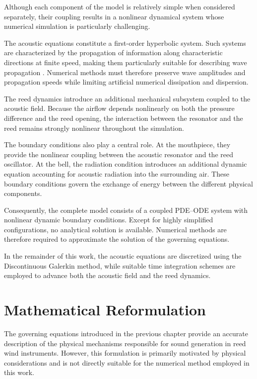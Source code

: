 \documentclass[11pt,a4paper]{report}
\theoremstyle{plain}
\theoremstyle{definition}
\begin{document}
Although each component of the model is relatively simple when considered separately, their coupling 
results in a nonlinear dynamical system whose numerical simulation is particularly challenging.

The acoustic equations constitute a first-order hyperbolic system. Such systems are characterized by 
the propagation of information along characteristic directions at finite speed, making them particularly 
suitable for describing wave propagation \cite{thibault}. Numerical methods must therefore preserve wave amplitudes and 
propagation speeds while limiting artificial numerical dissipation and dispersion.

The reed dynamics introduce an additional mechanical subsystem coupled to the acoustic field. Because 
the airflow depends nonlinearly on both the pressure difference and the reed opening, the interaction between the resonator and the reed remains strongly nonlinear throughout the simulation.

The boundary conditions also play a central role. At the mouthpiece, they provide the nonlinear coupling between the acoustic resonator and the reed oscillator. At the bell, the radiation condition introduces an additional dynamic equation accounting for acoustic radiation into the surrounding air. These boundary conditions govern the exchange of energy between the different physical components.

Consequently, the complete model consists of a coupled PDE--ODE system with nonlinear dynamic boundary conditions. Except for highly simplified configurations, no analytical solution is available. Numerical methods are therefore required to approximate the solution of the governing equations.

In the remainder of this work, the acoustic equations are discretized using the Discontinuous Galerkin method, while suitable time integration schemes are employed to advance both the acoustic field and the reed dynamics.
\chapter{Mathematical Reformulation}
\label{chap:mathematical_reformulation}

\minitoc

The governing equations introduced in the previous chapter provide an accurate
description of the physical mechanisms responsible for sound generation in reed
wind instruments. However, this formulation is primarily motivated by physical
considerations and is not directly suitable for the numerical method employed in
this work.
\end{document}
